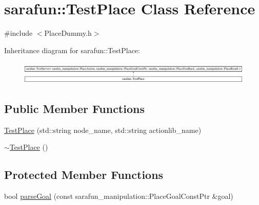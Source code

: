 \hypertarget{classsarafun_1_1TestPlace}{\section{sarafun\-:\-:Test\-Place Class Reference}
\label{classsarafun_1_1TestPlace}
}


{\ttfamily \#include $<$Place\-Dummy.\-h$>$}

Inheritance diagram for sarafun\-:\-:Test\-Place\-:\begin{figure}[H]
\begin{center}
\leavevmode
\includegraphics[height=1.104536cm]{classsarafun_1_1TestPlace}
\end{center}
\end{figure}
\subsection*{Public Member Functions}
\begin{DoxyCompactItemize}
\item 
\hyperlink{classsarafun_1_1TestPlace_a9f6925f4f93b3430e1687ed37999be59}{Test\-Place} (std\-::string node\-\_\-name, std\-::string actionlib\-\_\-name)
\item 
\hyperlink{classsarafun_1_1TestPlace_a419a921ef99346f693e1b661b5f668b7}{$\sim$\-Test\-Place} ()
\end{DoxyCompactItemize}
\subsection*{Protected Member Functions}
\begin{DoxyCompactItemize}
\item 
bool \hyperlink{classsarafun_1_1TestPlace_ac13e3b55f73d43dced8f74564b028e33}{parse\-Goal} (const sarafun\-\_\-manipulation\-::\-Place\-Goal\-Const\-Ptr \&goal)
\end{DoxyCompactItemize}


